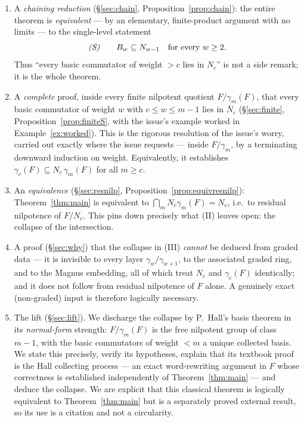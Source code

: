 \documentclass{amsart}
\theoremstyle{definition}
\theoremstyle{remark}
\begin{document}
\begin{enumerate}
\item[(I)] A \emph{chaining reduction} (\S\ref{sec:chain},
Proposition~\ref{prop:chain}): the entire theorem is \emph{equivalent} --- by an
elementary, finite-product argument with no limits --- to the single-level statement
\begin{equation}\label{eq:S}
\text{\emph{(S)}}\qquad B_w\subseteq N_{w-1}\quad\text{for every }w\ge 2 .
\end{equation}
Thus ``every basic commutator of weight $>c$ lies in $N_c$'' is not a side remark; it
is the whole theorem.
\item[(II)] A \emph{complete} proof, inside every finite nilpotent quotient
$F/\gamma_m(F)$, that every basic commutator of weight $w$ with $c\le w\le m-1$ lies
in $\bar N_c$ (\S\ref{sec:finite}, Proposition~\ref{prop:finiteS}, with the issue's
example worked in Example~\ref{ex:worked}). This is the rigorous resolution of the
issue's worry, carried out exactly where the issue requests --- inside $F/\gamma_m$,
by a terminating downward induction on weight. Equivalently, it establishes
$\gamma_c(F)\subseteq N_c\,\gamma_m(F)$ for all $m\ge c$.
\item[(III)] An \emph{equivalence} (\S\ref{sec:resnilp},
Proposition~\ref{prop:equivresnilp}): Theorem~\ref{thm:main} is equivalent to
$\bigcap_{m}N_c\gamma_m(F)=N_c$, i.e.\ to residual nilpotence of $F/N_c$. This pins
down precisely what (II) leaves open: the collapse of the intersection.
\item[(IV)] A proof (\S\ref{sec:why}) that the collapse in (III) \emph{cannot} be
deduced from graded data --- it is invisible to every layer $\gamma_w/\gamma_{w+1}$,
to the associated graded ring, and to the Magnus embedding, all of which treat $N_c$
and $\gamma_c(F)$ identically; and it does not follow from residual nilpotence of $F$
alone. A genuinely exact (non-graded) input is therefore logically necessary.
\item[(V)] The lift (\S\ref{sec:lift}). We discharge the collapse by P.~Hall's basis
theorem in its \emph{normal-form} strength: $F/\gamma_m(F)$ is the free nilpotent
group of class $m-1$, with the basic commutators of weight $<m$ a unique collected
basis. We state this precisely, verify its hypotheses, explain that its textbook
proof is the Hall collecting process --- an exact word-rewriting argument in $F$ whose
correctness is established independently of Theorem~\ref{thm:main} --- and deduce the
collapse. We are explicit that this classical theorem is logically equivalent to
Theorem~\ref{thm:main} but is a separately proved external result, so its use is a
citation and not a circularity.
\end{enumerate}
\end{document}
